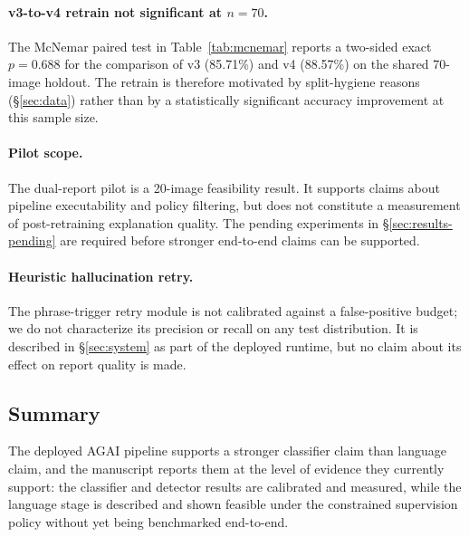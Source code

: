\paragraph{v3-to-v4 retrain not significant at $n=70$.}
The McNemar paired test in Table~\ref{tab:mcnemar} reports a
two-sided exact $p=0.688$ for the comparison of v3 (85.71\%) and v4
(88.57\%) on the shared 70-image holdout. The retrain is therefore
motivated by split-hygiene reasons (\S\ref{sec:data}) rather than by
a statistically significant accuracy improvement at this sample size.

\paragraph{Pilot scope.}
The dual-report pilot is a 20-image feasibility result. It supports
claims about pipeline executability and policy filtering, but does not
constitute a measurement of post-retraining explanation quality. The
pending experiments in \S\ref{sec:results-pending} are required before
stronger end-to-end claims can be supported.

\paragraph{Heuristic hallucination retry.}
The phrase-trigger retry module is not calibrated against a
false-positive budget; we do not characterize its precision or recall
on any test distribution. It is described in \S\ref{sec:system} as part
of the deployed runtime, but no claim about its effect on report
quality is made.

\subsection{Summary}

The deployed AGAI pipeline supports a stronger classifier claim than
language claim, and the manuscript reports them at the level of evidence
they currently support: the classifier and detector results are
calibrated and measured, while the language stage is described and
shown feasible under the constrained supervision policy without yet
being benchmarked end-to-end.
